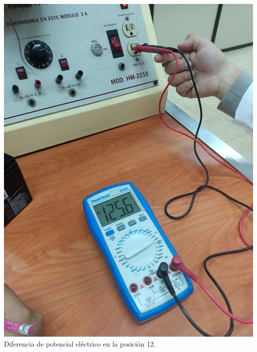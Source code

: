 \documentclass[10pt]{article}
\begin{document}
\begin{multicols}{2}
\begin{center}
	\includegraphics[scale = 0.1]{Imagenes/Fotos/12.jpeg}\\
	Diferencia de potencial eléctrico en la posición 12.

\end{center}
\end{multicols}
\end{document}
